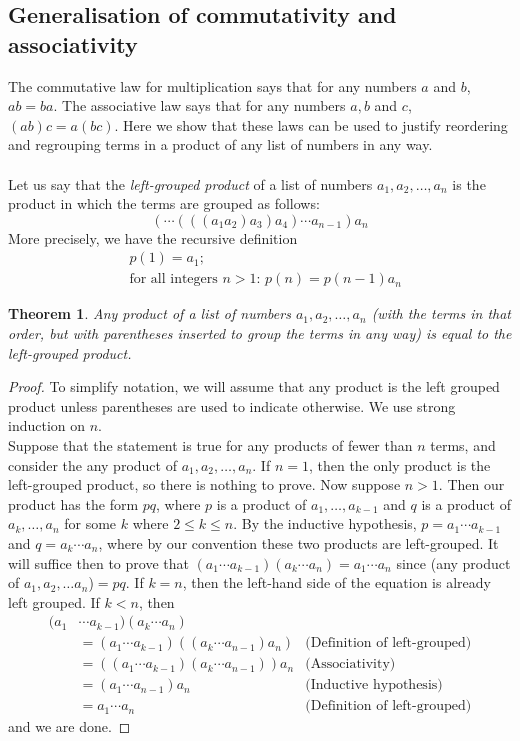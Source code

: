 \documentclass{report}
\newtheorem*{theorem}{Theorem}
\theoremstyle{definition}
\begin{document}
\subsection{Generalisation of commutativity and associativity}
The commutative law for multiplication says that for any numbers $a$ and $b$, $ab=ba$. The associative law says that for any numbers $a,b$ and $c$, $(ab)c=a(bc)$. Here we show that these laws can
be used to justify reordering and regrouping terms in a product of any list of numbers in any way.\\
\vspace{1mm}\\
Let us say that the \textit{left-grouped product} of a list of numbers $a_1,a_2,\ldots,a_n$ is the product in which the terms are grouped as follows:
\begin{equation*}
(\cdots(((a_1a_2)a_3)a_4)\cdots a_{n-1})a_n
\end{equation*}
More precisely, we have the recursive definition
\begin{align*}
&p(1)=a_1;\\
&\text{for all integers $n>1$: }p(n)=p(n-1)a_n
\end{align*}
\begin{theorem}
Any product of a list of numbers $a_1,a_2,\ldots,a_n$ (with the terms in that order, but with parentheses inserted to group the terms in any way) is equal to the left-grouped product.
\end{theorem}
\begin{proof}
To simplify notation, we will assume that any product is the left grouped product unless parentheses are used to indicate
otherwise. We use strong induction on $n$.\\
\indent Suppose that the statement is true for any products of fewer than $n$ terms, and consider the any product 
of $a_1,a_2,\ldots,a_n$. If $n=1$, then the only product is the left-grouped product, so there is nothing to prove. Now suppose
$n>1$. Then our product has the form $pq$, where $p$ is a product of $a_1,\ldots,a_{k-1}$ and $q$ is a product of $a_k,\ldots,a_n$
for some $k$ where $2\leq k\leq n$. By the inductive hypothesis, $p=a_1\cdots a_{k-1}$ and $q=a_k\cdots a_n$, where by our
convention these two products are left-grouped. It will suffice
then to prove that $(a_1\cdots a_{k-1})(a_k\cdots a_n)=a_1\cdots a_n$ since (any product of $a_1,a_2,\ldots a_n$)$=pq$.
If $k=n$, then the left-hand side of the equation is already left grouped. If $k<n$, then
\begin{align*}
(a_1&\cdots a_{k-1})(a_k\cdots a_n)\\
&=(a_1\cdots a_{k-1})((a_k\cdots a_{n-1})a_n)&\text{(Definition of left-grouped)}\\
&=((a_1\cdots a_{k-1})(a_k\cdots a_{n-1}))a_n&\text{(Associativity)}\\
&=(a_1\cdots a_{n-1})a_n&\text{(Inductive hypothesis)}\\
&=a_1\cdots a_{n}&\text{(Definition of left-grouped)}
\end{align*}
and we are done.
\end{proof}
\end{document}
